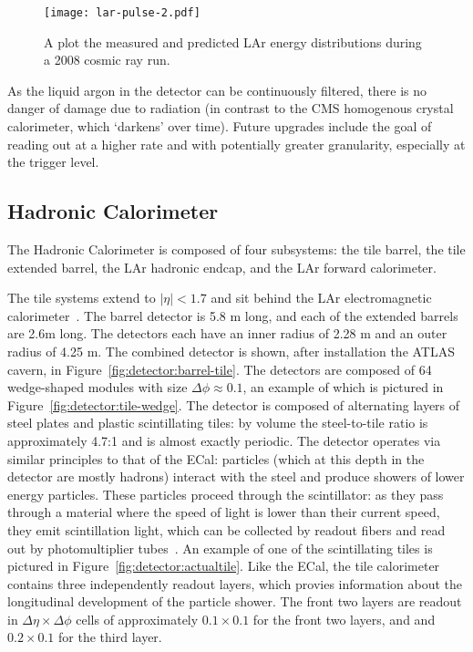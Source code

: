 

\begin{figure}
\centering
\texttt{[image: lar-pulse-2.pdf]}
\label{fig:detector:lar-pulse-2}
\caption{A plot the measured and predicted LAr energy distributions during a 2008 cosmic ray run.}
\end{figure}


As the liquid argon in the detector can be continuously filtered, there is no danger of damage due to radiation (in contrast to the CMS homogenous crystal calorimeter, which `darkens' over time). Future upgrades include the goal of reading out at a higher rate and with potentially greater granularity, especially at the trigger level.



\subsection{Hadronic Calorimeter}

The Hadronic Calorimeter is composed of four subsystems: the tile barrel, the tile extended barrel, the LAr hadronic endcap, and the LAr forward calorimeter. 

The tile systems extend to $|\eta| < 1.7$ and sit behind the LAr electromagnetic calorimeter~\cite{ATLASPaper,Tile}. The barrel detector is 5.8 m long, and each of the extended barrels are 2.6m long. The detectors each have an inner radius of 2.28 m and an outer radius of 4.25 m. The combined detector is shown, after installation the ATLAS cavern, in Figure~\ref{fig:detector:barrel-tile}. The detectors are composed of 64 wedge-shaped modules with size $\Delta\phi \approx 0.1$, an example of which is pictured in Figure~\ref{fig:detector:tile-wedge}. The detector is composed of alternating layers of steel plates and plastic scintillating tiles: by volume the steel-to-tile ratio is approximately 4.7:1 and is almost exactly periodic. The detector operates via similar principles to that of the ECal: particles (which at this depth in the detector are mostly hadrons) interact with the steel and produce showers of lower energy particles. These particles proceed through the scintillator: as they pass through a material where the speed of light is lower than their current speed, they emit scintillation light, which can be collected by readout fibers and read out by photomultiplier tubes~\cite{Wigmans,Detectors,Tile}. An example of one of the scintillating tiles is pictured in Figure~\ref{fig:detector:actualtile}. Like the ECal, the tile calorimeter contains three independently readout layers, which provies information about the longitudinal development of the particle shower. The front two layers are readout in $\Delta \eta \times \Delta\phi$ cells of approximately  $0.1 \times 0.1$ for the front two layers, and and $0.2 \times 0.1$ for the third layer.

